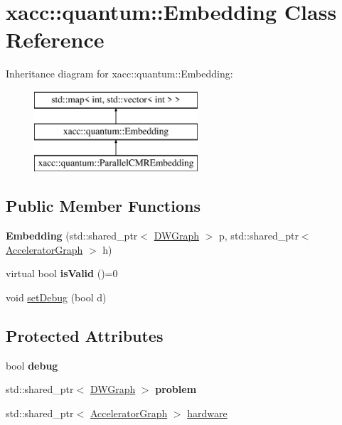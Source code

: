 \hypertarget{a00051}{}\section{xacc\+:\+:quantum\+:\+:Embedding Class Reference}
\label{a00051}
Inheritance diagram for xacc\+:\+:quantum\+:\+:Embedding\+:\begin{figure}[H]
\begin{center}
\leavevmode
\includegraphics[height=3.000000cm]{a00051}
\end{center}
\end{figure}
\subsection*{Public Member Functions}
\begin{DoxyCompactItemize}
\item 
{\bfseries Embedding} (std\+::shared\+\_\+ptr$<$ \hyperlink{a00043}{D\+W\+Graph} $>$ p, std\+::shared\+\_\+ptr$<$ \hyperlink{a00064}{Accelerator\+Graph} $>$ h)\hypertarget{a00051_ad9dae98746e1b14ece04b55e2285721d}{}\label{a00051_ad9dae98746e1b14ece04b55e2285721d}

\item 
virtual bool {\bfseries is\+Valid} ()=0\hypertarget{a00051_a030d542b458d1ba93f3b1f13bc603cdb}{}\label{a00051_a030d542b458d1ba93f3b1f13bc603cdb}

\item 
void \hyperlink{a00051_ab3f10710c26f020468de75e54e079677}{set\+Debug} (bool d)
\end{DoxyCompactItemize}
\subsection*{Protected Attributes}
\begin{DoxyCompactItemize}
\item 
bool {\bfseries debug}\hypertarget{a00051_afd3c0e306d2b805e52d0a2e529ef286e}{}\label{a00051_afd3c0e306d2b805e52d0a2e529ef286e}

\item 
std\+::shared\+\_\+ptr$<$ \hyperlink{a00043}{D\+W\+Graph} $>$ {\bfseries problem}\hypertarget{a00051_a152cc78570c229fb272565fb60b00d42}{}\label{a00051_a152cc78570c229fb272565fb60b00d42}

\item 
std\+::shared\+\_\+ptr$<$ \hyperlink{a00064}{Accelerator\+Graph} $>$ \hyperlink{a00051_a63d22756b8ad0f1a689b46d17a0ce81e}{hardware}
\end{DoxyCompactItemize}


